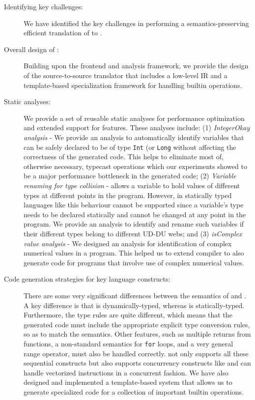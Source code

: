 \begin{description}

\item[Identifying key challenges:] We have identified the key challenges
in performing a semantics-preserving efficient translation of \matlab to \xten.

\item[Overall design of \mixten:] Building upon the \mclab frontend and analysis
framework, we provide the design of the \mixten
source-to-source translator that includes a low-level \xten IR and a
template-based specialization framework for handling builtin operations.

\item[Static analyses:] We provide a set of reusable static analyses for
performance optimization and extended support for \matlab features. These
analyses include: (1) \emph{IntegerOkay analysis} - We provide an analysis to
automatically identify
variables that can be safely declared to be of type \texttt{Int} (or
\texttt{Long} without
affecting the correctness of the generated \xten code. This helps to eliminate
most of, otherwise necessary, typecast operations which our experiments
showed to be a major performance bottleneck in the generated code; (2)
\emph{Variable renaming for type collision} - \matlab allows a variable to 
hold values of different
types at different points in the program. However, in statically typed
languages like \xten this behaviour cannot be supported since a 
variable's type needs to be declared statically and cannot be changed at any
point in the program. We provide an analysis to identify and rename such
variables if their different types belong to different UD-DU webs; and (3)
\emph{isComplex value analysis} - We designed an analysis for identification of
complex numerical values in a \matlab program. This helped us to extend \mixten
compiler to also generate \xten code for \matlab programs that involve use of
complex numerical values.

\item[Code generation strategies for key language constructs:]  There
are some very significant differences between the semantics of \matlab
and \xten.  A key difference is that \matlab is dynamically-typed,
whereas \xten is statically-typed.   Furthermore, the type rules are
quite different, which means that the generated \xten code must include
the appropriate explicit type conversion rules, so as to match the
\matlab semantics.   Other \matlab features, such as multiple returns
from functions, a non-standard semantics for \texttt{for} loops, and a
very general range operator, must also be handled correctly.
\mixten not only supports all these sequential constructs but also supports
concurrency constructs like \parfor and can handle vectorized instructions in a
concurrent fashion.
We have also designed and implemented a template-based system that allows us to
generate specialized \xten code for a collection of important \matlab builtin
operations.
  

\end{description}
